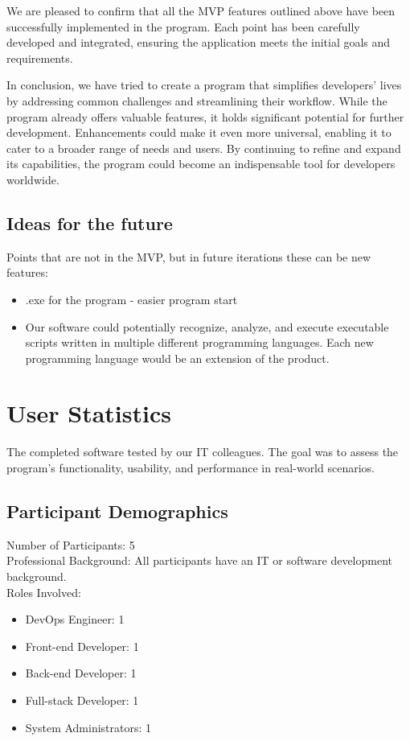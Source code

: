\documentclass{article}
\begin{document}
We are pleased to confirm that all the MVP features outlined above have been successfully implemented in the program. Each point has been carefully developed and integrated, ensuring the application meets the initial goals and requirements.

In conclusion, we have tried to create a program that simplifies developers’ lives by addressing common challenges and streamlining their workflow. While the program already offers valuable features, it holds significant potential for further development. Enhancements could make it even more universal, enabling it to cater to a broader range of needs and users. By continuing to refine and expand its capabilities, the program could become an indispensable tool for developers worldwide.

\subsection{Ideas for the future}

Points that are not in the MVP, but in future iterations these can be new features:
    \begin{itemize}
        \item .exe for the program - easier program start
        \item Our software could potentially recognize, analyze, and execute executable scripts written in multiple different programming languages. Each new programming language would be an extension of the product.
    \end{itemize}

\clearpage

\section{User Statistics}
The completed software tested by our IT colleagues. The goal was to assess the program's functionality, usability, and performance in real-world scenarios.

\subsection{Participant Demographics}
Number of Participants: 5\\
Professional Background: All participants have an IT or software development background. \\
Roles Involved:
\begin{itemize}
    \item DevOps Engineer: 1
    \item Front-end Developer: 1
    \item Back-end Developer: 1
    \item Full-stack Developer: 1
    \item System Administrators: 1
\end{itemize}
\end{document}
